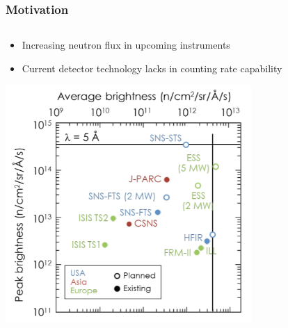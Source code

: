 \documentclass[xcolor=x11names, compress, handout]{beamer}
\renewcommand{\(}{\begin{columns}}
\renewcommand{\)}{\end{columns}}
\newcommand{\<}[1]{\begin{column}{#1}}
\renewcommand{\>}{\end{column}}
\begin{document}
\begin{frame}
  \frametitle{Motivation}

  \begin{columns}
  \begin{column}{0.5\textwidth}
  \begin{itemize}
  \item Increasing neutron flux in upcoming instruments
  \item Current detector technology lacks in counting rate capability
  \end{itemize}
  \begin{center}
  \includegraphics[width=0.7\textwidth]{images/neutron_sources.png}
  \end{center}
  \end{column}


\end{columns}
\end{frame}
\end{document}
